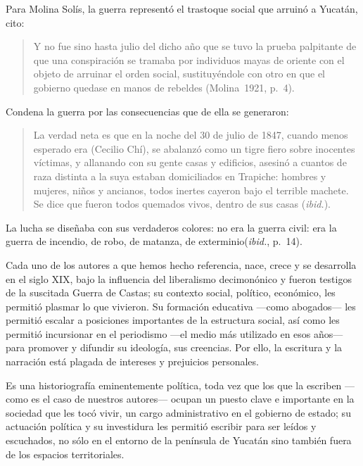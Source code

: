 Para Molina Solís, la guerra representó el trastoque social que arruinó a
Yucatán, cito:


\begin{quotation}
Y no fue sino hasta julio del dicho año que se tuvo la prueba palpitante de
que una conspiración se tramaba por individuos mayas de oriente con el
objeto de arruinar el orden social, sustituyéndole con otro en que el
gobierno quedase en manos de rebeldes (Molina~1921, p.~4).
\end{quotation}

Condena la guerra por las consecuencias que de ella se generaron:

\begin{quotation}
La verdad neta es que en la noche del 30 de julio de 1847,  cuando menos
esperado era (Cecilio Chí), se abalanzó como un tigre fiero sobre 
inocentes víctimas, y allanando con su gente casas y edificios, asesinó a
cuantos de raza distinta a la suya estaban domiciliados en Trapiche: hombres
y mujeres, niños y ancianos, todos inertes cayeron bajo el terrible
machete. Se dice que fueron todos quemados vivos, dentro de sus casas
(\textit{ibid.}).
\end{quotation}
 
La lucha se diseñaba con sus verdaderos colores: no era la guerra civil: era
la guerra de incendio, de robo, de matanza, de exterminio\linebreak (\textit{ibid.}, p.~14).

Cada uno de los autores a que hemos hecho referencia, nace, crece y se desarrolla en el
siglo XIX, bajo la influencia del liberalismo decimonónico y fueron
testigos de la suscitada Guerra de Castas; su contexto social, político,
económico, les permitió plasmar lo que vivieron. Su formación educativa
 ---como abogados--- les permitió escalar a posiciones importantes de la
estructura social, así como les permitió incursionar en el periodismo ---el
medio más utilizado en esos años--- para promover y difundir su ideología,
sus creencias. Por  ello, la escritura y la narración está plagada de
intereses y prejuicios personales. 


Es una historiografía eminentemente política, toda vez que los que la
escriben ---como es el caso de nuestros autores--- ocupan un puesto clave e
importante en la sociedad que les tocó vivir, un cargo administrativo en el
gobierno de estado; su actuación política y su investidura les permitió
escribir para ser leídos y escuchados, no sólo en el entorno de la
península de Yucatán sino también fuera de los espacios territoriales.


